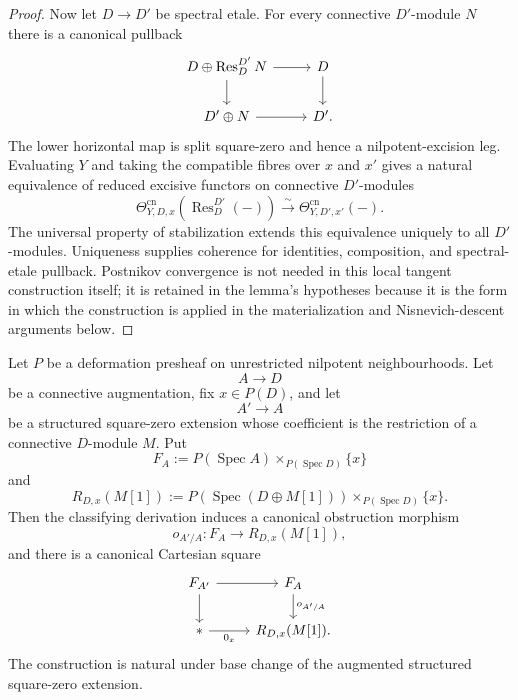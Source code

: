 \begin{proof}
Now let $D\to D'$ be spectral etale.  For every connective $D'$-module $N$
there is a canonical pullback
\[
\begin{tikzcd}
D\oplus \operatorname{Res}^{D'}_D N \arrow[r] \arrow[d] &
D \arrow[d]\\
D'\oplus N \arrow[r] &
D'.
\end{tikzcd}
\]
The lower horizontal map is split square-zero and hence a
nilpotent-excision leg.  Evaluating $Y$ and taking the compatible fibres over
$x$ and $x'$ gives a natural equivalence of reduced excisive functors on
connective $D'$-modules
\[
    \Theta^{\mathrm{cn}}_{Y,D,x}
    \left(
      \operatorname{Res}^{D'}_D(-)
    \right)
    \xrightarrow{\sim}
    \Theta^{\mathrm{cn}}_{Y,D',x'}(-).
\]
The universal property of stabilization extends this equivalence uniquely to
all $D'$-modules.  Uniqueness supplies coherence for identities, composition,
and spectral-etale pullback.  Postnikov convergence is not needed in this
local tangent construction itself; it is retained in the lemma's hypotheses
because it is the form in which the construction is applied in the
materialization and Nisnevich-descent arguments below.
\end{proof}

\begin{lemma}
\label{lem:bnli-relative-square-zero-obstruction-fibre}
Let $P$ be a deformation presheaf on unrestricted nilpotent neighbourhoods.
Let
\[
    A\longrightarrow D
\]
be a connective augmentation, fix $x\in P(D)$, and let
\[
    A'\longrightarrow A
\]
be a structured square-zero extension whose coefficient is the restriction of
a connective $D$-module $M$.  Put
\[
    F_A
    :=
    P(\operatorname{Spec}A)
    \times_{P(\operatorname{Spec}D)}
    \{x\}
\]
and
\[
    R_{D,x}(M[1])
    :=
    P(\operatorname{Spec}(D\oplus M[1]))
    \times_{P(\operatorname{Spec}D)}
    \{x\}.
\]
Then the classifying derivation induces a canonical obstruction morphism
\[
    o_{A'/A}:F_A\longrightarrow R_{D,x}(M[1]),
\]
and there is a canonical Cartesian square
\[
\begin{tikzcd}
F_{A'} \arrow[r] \arrow[d] &
F_A \arrow[d,"o_{A'/A}"]\\
* \arrow[r,"0_x"'] &
R_{D,x}(M[1]).
\end{tikzcd}
\]
The construction is natural under base change of the augmented structured
square-zero extension.
\end{lemma}


